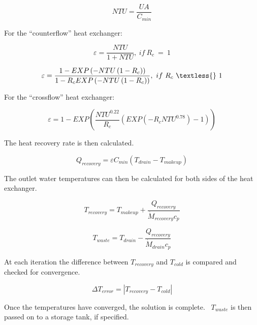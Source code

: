 \begin{equation}
NTU = \frac{{UA}}{{{C_{min}}}}
\end{equation}

For the ``counterflow'' heat exchanger:

\begin{equation}
\varepsilon = \frac{{NTU}}{{1 + NTU}},~if~{R_c}~=~1
\end{equation}

\begin{equation}
\varepsilon = \frac{{1 - EXP\left( { - NTU\left( {1 - {R_c}} \right)} \right)}}{{1 - {R_c}EXP\left( { - NTU\left( {1 - {R_c}} \right)} \right)}},~if~{R_c}~\textless{}~1
\end{equation}

For the ``crossflow'' heat exchanger:

\begin{equation}
\varepsilon  = 1 - EXP\left( {\frac{{NT{U^{0.22}}}}{{{R_c}}}\left( {EXP\left( { - {R_c}NT{U^{0.78}}} \right) - 1} \right)} \right)
\end{equation}

The heat recovery rate is then calculated.

\begin{equation}
{Q_{recovery}} = \varepsilon {C_{min}}\left( {{T_{drain}} - {T_{makeup}}} \right)
\end{equation}

The outlet water temperatures can then be calculated for both sides of the heat exchanger.

\begin{equation}
{T_{recovery}} = {T_{makeup}} + \frac{{{Q_{recovery}}}}{{{{\dot M}_{recovery}}{c_p}}}
\end{equation}

\begin{equation}
{T_{waste}} = {T_{drain}} - \frac{{{Q_{recovery}}}}{{{{\dot M}_{drain}}{c_p}}}
\end{equation}

At each iteration the difference between \({T_{recovery}}\) and \({T_{cold}}\) is compared and checked for convergence.

\begin{equation}
\Delta {T_{error}} = \left| {{T_{recovery}} - {T_{cold}}} \right|
\end{equation}

Once the temperatures have converged, the solution is complete.~ \({T_{waste}}\) is then passed on to a storage tank, if specified.
